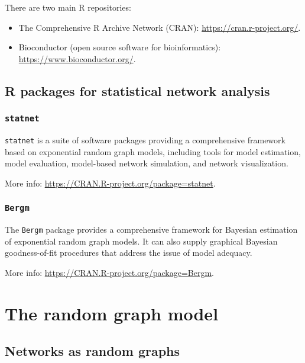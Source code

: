 \documentclass[]{book}
\providecommand{\tightlist}{%
  \setlength{\itemsep}{0pt}\setlength{\parskip}{0pt}}
\begin{document}
There are two main R repositories:

\begin{itemize}
\tightlist
\item
  The Comprehensive R Archive Network (CRAN):
  \url{https://cran.r-project.org/}.
\item
  Bioconductor (open source software for bioinformatics):
  \url{https://www.bioconductor.org/}.
\end{itemize}

\section{R packages for statistical network
analysis}\label{r-packages-for-statistical-network-analysis}

\subsection{\texorpdfstring{\texttt{statnet}}{statnet}}\label{statnet}

\texttt{statnet} \citep{statnet} is a suite of software packages
providing a comprehensive framework based on exponential random graph
models, including tools for model estimation, model evaluation,
model-based network simulation, and network visualization.

More info: \url{https://CRAN.R-project.org/package=statnet}.

\subsection{\texorpdfstring{\texttt{Bergm}}{Bergm}}\label{bergm}

The \texttt{Bergm} package \citep{cai:fri14} provides a comprehensive
framework for Bayesian estimation of exponential random graph models. It
can also supply graphical Bayesian goodness-of-fit procedures that
address the issue of model adequacy.

More info: \url{https://CRAN.R-project.org/package=Bergm}.

\chapter{The random graph model}\label{RGM}

\section{Networks as random graphs}\label{networks-as-random-graphs}
\end{document}
